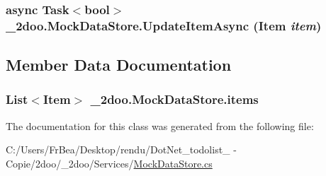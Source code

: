 \hypertarget{class__2doo_1_1_mock_data_store_459104a50acf502a1eda2820ad5c1bad}{
\subsubsection[{UpdateItemAsync}]{\setlength{\rightskip}{0pt plus 5cm}async Task$<$bool$>$ \_\-2doo.MockDataStore.UpdateItemAsync ({\bf Item} {\em item})}}
\label{class__2doo_1_1_mock_data_store_459104a50acf502a1eda2820ad5c1bad}




\subsection{Member Data Documentation}
\hypertarget{class__2doo_1_1_mock_data_store_3349ecdb0ef5ee8548152ed45e3af496}{
\subsubsection[{items}]{\setlength{\rightskip}{0pt plus 5cm}List$<${\bf Item}$>$ {\bf \_\-2doo.MockDataStore.items}}}
\label{class__2doo_1_1_mock_data_store_3349ecdb0ef5ee8548152ed45e3af496}




The documentation for this class was generated from the following file:\begin{CompactItemize}
\item 
C:/Users/FrBea/Desktop/rendu/DotNet\_\-todolist\_ - Copie/2doo/\_\-2doo/Services/\hyperlink{_mock_data_store_8cs}{MockDataStore.cs}\end{CompactItemize}
